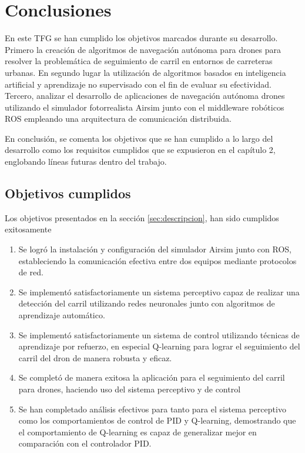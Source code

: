 \chapter{Conclusiones}
\label{cap:capitulo5}

En este TFG se han cumplido los objetivos marcados durante su desarrollo. Primero la creación de algoritmos de
navegación autónoma para drones para resolver la problemática de seguimiento de carril en entornos de carreteras
urbanas. En segundo lugar la utilización de algoritmos basados en inteligencia artificial y aprendizaje no supervisado
con el fin de evaluar su efectividad. Tercero, analizar el desarrollo de aplicaciones de navegación autónoma drones
utilizando el simulador fotorrealista Airsim junto con el middleware robóticos ROS empleando una arquitectura de
comunicación distribuida. 

En conclusión, se comenta los objetivos que se han cumplido a lo largo del desarrollo como los requisitos cumplidos
que se expusieron en el capítulo 2, englobando líneas futuras dentro del trabajo. 

\section{Objetivos cumplidos}
\label{objetivos_cumplidos}

Los objetivos presentados en la sección \ref{sec:descripcion}, han sido cumplidos exitosamente 
\begin{enumerate}
    \item Se logró la instalación y configuración del simulador Airsim junto con ROS, estableciendo la comunicación efectiva
    entre dos equipos mediante protocolos de red. 
    \item Se implementó satisfactoriamente un sistema perceptivo capaz de realizar una detección del carril utilizando 
    redes neuronales junto con algoritmos de aprendizaje automático.
    \item Se implementó satisfactoriamente un sistema de control utilizando técnicas de aprendizaje por refuerzo, en especial Q-learning 
    para lograr el seguimiento del carril del dron de manera robusta y eficaz.
    \item Se completó de manera exitosa la aplicación para el seguimiento del carril para drones, haciendo uso del sistema perceptivo y de control
    \item Se han completado análisis efectivos para tanto para el sistema perceptivo como los comportamientos de control de PID y Q-learning, demostrando que el comportamiento
    de Q-learning es capaz de generalizar mejor en comparación con el controlador PID.
\end{enumerate}

